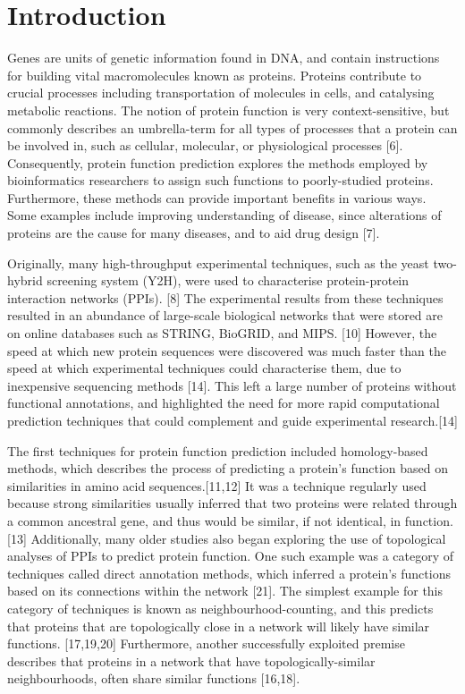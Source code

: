 \documentclass[9pt]{article}
\begin{document}
\section{Introduction}\label{sec:Introduction}
Genes are units of genetic information found in DNA, and contain instructions for building vital macromolecules known as proteins. Proteins contribute to crucial processes including transportation of molecules in cells, and catalysing metabolic reactions. The notion of protein function is very context-sensitive, but commonly describes an umbrella-term for all types of processes that a protein can be involved in, such as cellular, molecular, or physiological processes [6]. Consequently, protein function prediction explores the methods employed by bioinformatics researchers to assign such functions to poorly-studied proteins. Furthermore, these methods can provide important benefits in various ways. Some examples include improving understanding of disease, since alterations of proteins are the cause for many diseases, and to aid drug design [7].
\par
Originally, many high-throughput experimental techniques, such as the yeast two-hybrid screening system (Y2H), were used to characterise protein-protein interaction networks (PPIs). [8] The experimental results from these techniques resulted in an abundance of large-scale biological networks that were stored are on online databases such as STRING, BioGRID, and MIPS. [10] However, the speed at which new protein sequences were discovered was much faster than the speed at which experimental techniques could characterise them, due to inexpensive sequencing methods [14]. This left a large number of proteins without functional annotations, and highlighted the need for more rapid computational prediction techniques that could complement and guide experimental research.[14]
\par
The first techniques for protein function prediction included homology-based methods, which describes the process of predicting a protein’s function based on similarities in amino acid sequences.[11,12] It was a technique regularly used because strong similarities usually inferred that two proteins were related through a common ancestral gene, and thus would be similar, if not identical, in function. [13] Additionally, many older studies also began exploring the use of topological analyses of PPIs to predict protein function. One such example was a category of techniques called direct annotation methods, which inferred a protein’s functions based on its connections within the network [21]. The simplest example for this category of techniques is known as neighbourhood-counting, and this predicts that proteins that are topologically close in a network will likely have similar functions. [17,19,20] Furthermore, another successfully exploited premise describes that proteins in a network that have topologically-similar neighbourhoods, often share similar functions [16,18]. 
\end{document}
